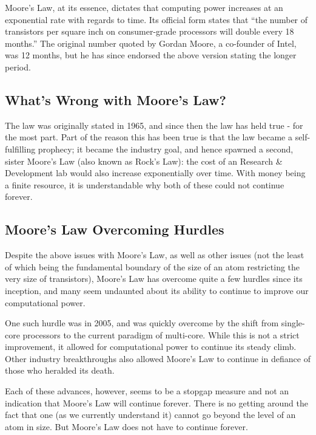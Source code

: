 \documentclass[12pt]{article} %
\begin{document}
Moore's Law, at its essence, dictates that computing power increases at an exponential rate with regards to time. Its official form states that ``the number of transistors per square inch on consumer-grade processors will double every 18 months.'' The original number quoted by Gordan Moore, a co-founder of Intel, was 12 months, but he has since endorsed the above version stating the longer period.


\subsection{What's Wrong with Moore's Law?} %

The law was originally stated in 1965, and since then the law has held true - for the most part. Part of the reason this has been true is that the law became a self-fulfilling prophecy; it became the industry goal, and hence spawned a second, sister Moore's Law (also known as Rock's Law): the cost of an Research \& Development lab would also increase exponentially over time. With money being a finite resource, it is understandable why both of these could not continue forever.


\subsection{Moore's Law Overcoming Hurdles} %

Despite the above issues with Moore's Law, as well as other issues (not the least of which being the fundamental boundary of the size of an atom restricting the very size of transistors), Moore's Law has overcome quite a few hurdles since its inception, and many seem undaunted about its ability to continue to improve our computational power.

One such hurdle was in 2005, and was quickly overcome by the shift from single-core processors to the current paradigm of multi-core. While this is not a strict improvement, it allowed for computational power to continue its steady climb. Other industry breakthroughs also allowed Moore's Law to continue in defiance of those who heralded its death.

Each of these advances, however, seems to be a stopgap measure and not an indication that Moore's Law will continue forever. There is no getting around the fact that one (as we currently understand it) cannot go beyond the level of an atom in size. But Moore's Law does not have to continue forever.
\end{document}
